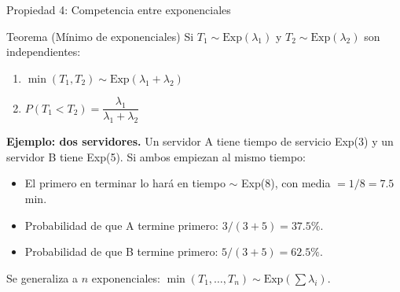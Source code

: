 \documentclass[aspectratio=1610, 9pt]{beamer}
\begin{document}
\begin{frame}{Propiedad 4: Competencia entre exponenciales}

\begin{block}{Teorema (M\'{i}nimo de exponenciales)}
Si $T_1 \sim \text{Exp}(\lambda_1)$ y $T_2 \sim \text{Exp}(\lambda_2)$ son independientes:
\begin{enumerate}
    \item $\min(T_1, T_2) \sim \text{Exp}(\lambda_1 + \lambda_2)$
    \item $P(T_1 < T_2) = \dfrac{\lambda_1}{\lambda_1 + \lambda_2}$
\end{enumerate}
\end{block}

\vspace{0.2cm}
\textbf{Ejemplo: dos servidores.} Un servidor A tiene tiempo de servicio Exp(3) y un servidor B tiene Exp(5). Si ambos empiezan al mismo tiempo:

\vspace{0.2cm}
\begin{itemize}
    \item El primero en terminar lo har\'{a} en tiempo $\sim$ Exp(8), con media $= 1/8 = 7.5$ min.
    \item Probabilidad de que A termine primero: $3/(3+5) = 37.5\%$.
    \item Probabilidad de que B termine primero: $5/(3+5) = 62.5\%$.
\end{itemize}

\vspace{0.2cm}
Se generaliza a $n$ exponenciales: $\min(T_1, \ldots, T_n) \sim \text{Exp}(\sum \lambda_i)$.
\end{frame}
\end{document}
